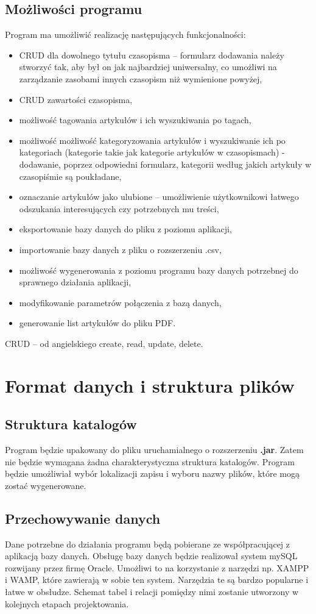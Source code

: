 \subsection{Możliwości programu}
Program ma umożliwić realizację następujących funkcjonalności:
\begin{itemize}
\item CRUD dla dowolnego tytułu czasopisma -- formularz dodawania należy stworzyć tak, aby był on jak najbardziej uniwersalny, co umożliwi na zarządzanie zasobami innych czasopism niż wymienione powyżej,
\item CRUD zawartości czasopisma,
\item możliwość tagowania artykułów i ich wyszukiwania po tagach,
\item możliwość możliwość kategoryzowania artykułów i wyszukiwanie ich po kategoriach (kategorie takie jak kategorie artykułów w czasopismach) - dodawanie, poprzez odpowiedni formularz, kategorii według jakich artykuły w czasopiśmie są poukładane,
\item oznaczanie artykułów jako ulubione -- umożliwienie użytkownikowi łatwego odszukania interesujących czy potrzebnych mu treści,
\item eksportowanie bazy danych do pliku z poziomu aplikacji,
\item importowanie bazy danych z pliku o rozszerzeniu .csv,
\item możliwość wygenerowania z poziomu programu bazy danych potrzebnej do sprawnego działania aplikacji,
\item modyfikowanie parametrów połączenia z bazą danych,
\item generowanie list artykułów do pliku PDF.
\end{itemize}
CRUD -- od angielskiego create, read, update, delete.

\section{Format danych i struktura plików}
\subsection{Struktura katalogów}
Program będzie upakowany do pliku uruchamialnego o rozszerzeniu \textbf{.jar}. Zatem nie będzie wymagana żadna charakterystyczna struktura katalogów. Program będzie umożliwiał wybór lokalizacji zapisu i wyboru nazwy plików, które mogą zostać wygenerowane. 

\subsection{Przechowywanie danych}
Dane potrzebne do działania programu będą pobierane ze współpracującej z aplikacją bazy danych. Obsługę bazy danych będzie realizował system mySQL rozwijany przez firmę Oracle. Umożliwi to na korzystanie z narzędzi np. XAMPP i WAMP, które zawierają w sobie ten system. Narzędzia te są bardzo popularne i łatwe w obsłudze. Schemat tabel i relacji pomiędzy nimi zostanie utworzony w kolejnych etapach projektowania.

